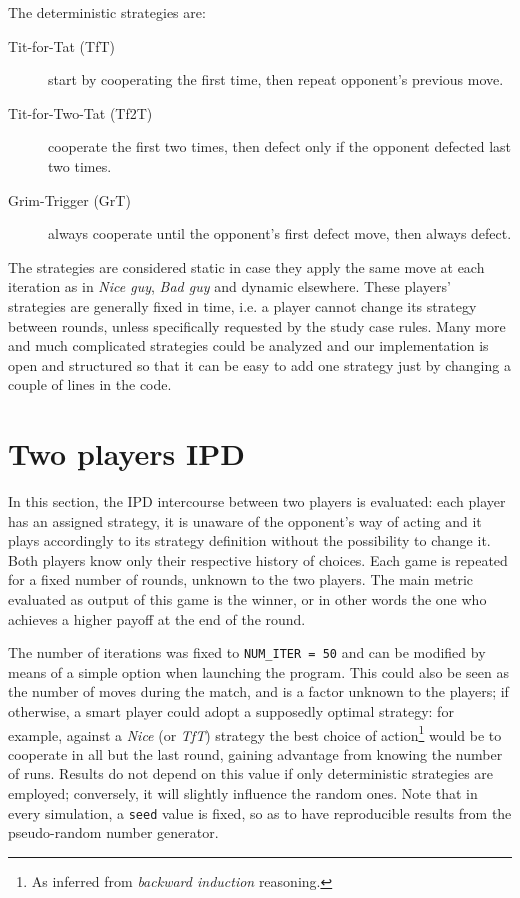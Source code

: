 \documentclass[journal,10pt,twoside]{IEEEtran}
\begin{document}
The deterministic strategies are:
\begin{description}
    \item[Tit-for-Tat (TfT)] start by cooperating the first time, then repeat opponent's previous move.
    \item[Tit-for-Two-Tat (Tf2T)] cooperate the first two times, then defect only if the opponent defected last two times.
    \item[Grim-Trigger (GrT)] always cooperate until the opponent's first defect move, then always defect. 
\end{description}

The strategies are considered static in case they apply the same move at each iteration as in \textit{Nice guy}, \textit{Bad guy} and dynamic elsewhere.
These players' strategies are generally fixed in time, i.e. a player cannot change its strategy between rounds, unless specifically requested by the study case rules.
Many more and much complicated strategies could be analyzed and our implementation is open and structured so that it can be easy to add one strategy just by changing a couple of lines in the code.

\section{Two players IPD} \label{s:IPD2P}
In this section, the IPD intercourse between two players is evaluated: each player has an assigned strategy, it is unaware of the opponent's way of acting and it plays accordingly to its strategy definition without the possibility to change it. Both players know only their respective history of choices. Each game is repeated for a fixed number of rounds, unknown to the two players. The main metric evaluated as output of this game is the winner, or in other words the one who achieves a higher payoff at the end of the round.

The number of iterations was fixed to \texttt{NUM\_ITER = 50} and can be modified by means of a simple option when launching the program.
This could also be seen as the number of moves during the match, and is a factor unknown to the players; if otherwise, a smart player could adopt a supposedly optimal strategy: for example, against a \textit{Nice} (or \textit{TfT}) strategy the best choice of action\footnote{As inferred from \textit{backward induction} reasoning.} would be to cooperate in all but the last round, gaining advantage from knowing the number of runs.
Results do not depend on this value if only deterministic strategies are employed; conversely, it will slightly influence the random ones.
Note that in every simulation, a \texttt{seed} value is fixed, so as to have reproducible results from the pseudo-random number generator.
\end{document}

